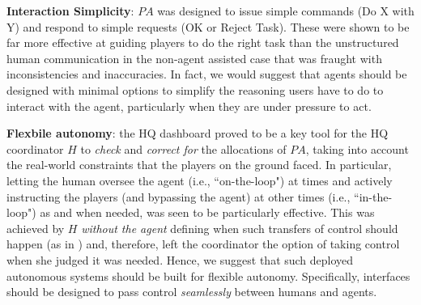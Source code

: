 \noindent \textbf{Interaction Simplicity}: $PA$ was designed to issue simple commands (Do X with Y) and respond to simple requests (OK or Reject Task). These were shown to be far more effective at guiding players to do the right task than the unstructured human communication in the non-agent assisted case that was fraught with inconsistencies and inaccuracies. In fact, we would suggest that agents should be designed with minimal options to simplify the reasoning users have to do to interact with the agent, particularly when they are under pressure to act.

\noindent \textbf{Flexbile autonomy}: the HQ dashboard proved to be a key tool for the HQ coordinator $H$ to \emph{check} and \emph{correct for} the allocations of $PA$, taking into account the real-world constraints that the players on the ground faced. In particular, letting the human oversee the agent (i.e., ``on-the-loop") at times and actively instructing  the players (and bypassing the agent) at other times (i.e., ``in-the-loop") as and when needed, was seen to be particularly effective. This was achieved by $H$ \emph{without the agent} defining when such transfers of control should happen (as in \cite{scerri:etal:2005}) and, therefore, left the coordinator the option of taking control when she judged it was needed. Hence, we suggest that such deployed autonomous systems should be built for flexible autonomy. Specifically, interfaces should be designed to pass control \emph{seamlessly} between humans and agents.


